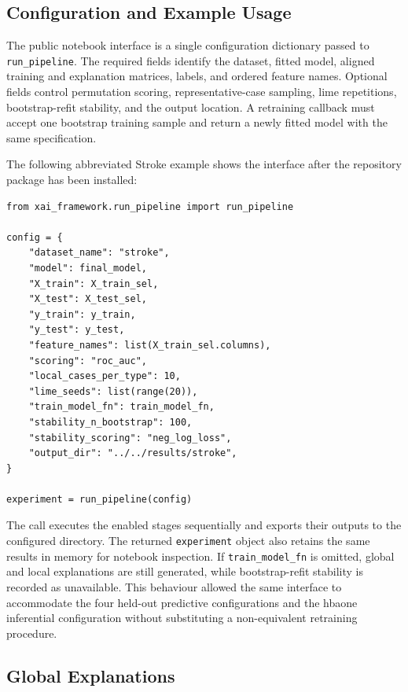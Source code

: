 \subsection{Configuration and Example Usage}

The public notebook interface is a single configuration dictionary passed to \texttt{run\_pipeline}. The required fields identify the dataset, fitted model, aligned training and explanation matrices, labels, and ordered feature names. Optional fields control permutation scoring, representative-case sampling, \gls{lime} repetitions, bootstrap-refit stability, and the output location. A retraining callback must accept one bootstrap training sample and return a newly fitted model with the same specification.

The following abbreviated Stroke example shows the interface after the repository package has been installed:

\begin{samepage}
\begin{small}
\begin{verbatim}
from xai_framework.run_pipeline import run_pipeline

config = {
    "dataset_name": "stroke",
    "model": final_model,
    "X_train": X_train_sel,
    "X_test": X_test_sel,
    "y_train": y_train,
    "y_test": y_test,
    "feature_names": list(X_train_sel.columns),
    "scoring": "roc_auc",
    "local_cases_per_type": 10,
    "lime_seeds": list(range(20)),
    "train_model_fn": train_model_fn,
    "stability_n_bootstrap": 100,
    "stability_scoring": "neg_log_loss",
    "output_dir": "../../results/stroke",
}

experiment = run_pipeline(config)
\end{verbatim}
\end{small}
\end{samepage}

The call executes the enabled stages sequentially and exports their outputs to the configured directory. The returned \texttt{experiment} object also retains the same results in memory for notebook inspection. If \texttt{train\_model\_fn} is omitted, global and local explanations are still generated, while bootstrap-refit stability is recorded as unavailable. This behaviour allowed the same interface to accommodate the four held-out predictive configurations and the \gls{hbaone} inferential configuration without substituting a non-equivalent retraining procedure.

\subsection{Global Explanations}

